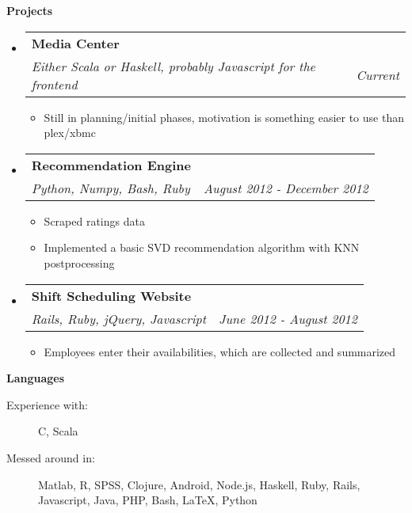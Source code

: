 \documentclass[letterpaper,11pt]{article}
\makeatletter
\newcommand{\resitem}[1]{\item #1 \vspace{-2pt}}
\newcommand{\resheading}[1]{{\large {\textbf{#1 \vphantom{p\^{E}}}}}}
\newcommand{\ressubheading}[4]{
  \begin{tabular*}{6.5in}{l@{\extracolsep{\fill}}r}
    \textbf{#1} & #2 \\
    \textit{#3} & \textit{#4} \\
  \end{tabular*}\vspace{-6pt}}
\makeatother
\begin{document}
\resheading{Projects}
\begin{itemize}
\item[]
  \ressubheading{Media Center}{}{Either Scala or Haskell, probably Javascript for the frontend}{Current}
  \begin{itemize}
    \resitem{Still in planning/initial phases, motivation is something easier to use than plex/xbmc}
  \end{itemize}
  
\item[]
  \ressubheading{Recommendation Engine}{}{Python, Numpy, Bash, Ruby}{August 2012 - December 2012}
  \begin{itemize}
    \resitem{Scraped ratings data}
    \resitem{Implemented a basic SVD recommendation algorithm with KNN postprocessing}
  \end{itemize}
  
\item[]
  \ressubheading{Shift Scheduling Website}{}{Rails, Ruby, jQuery, Javascript}{June 2012 - August 2012}
  \begin{itemize}
    \resitem{Employees enter their availabilities, which are collected and summarized}
  \end{itemize}
  
\end{itemize}

\resheading{Languages}

\begin{description}
\item[Experience with:]
  C, Scala
\item[Messed around in:]
  Matlab, R, SPSS, Clojure, Android, Node.js, Haskell, Ruby, Rails, Javascript, Java, PHP, Bash, \LaTeX, Python
\end{description}
\end{document}

